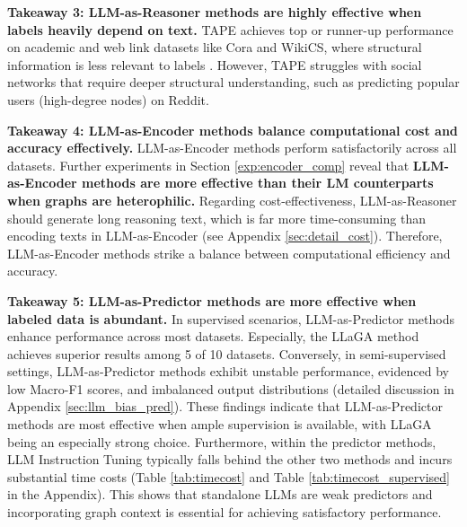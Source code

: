 
\textbf{Takeaway 3: LLM-as-Reasoner methods are highly effective when labels heavily depend on text.} TAPE achieves top or runner-up performance on academic and web link datasets like Cora and WikiCS, where structural information is less relevant to labels \cite{zhang2021graphless}. However, TAPE struggles with social networks that require deeper structural understanding, such as predicting popular users (high-degree nodes) on Reddit. 


\textbf{Takeaway 4: LLM-as-Encoder methods balance computational cost and accuracy effectively.} LLM-as-Encoder methods perform satisfactorily across all datasets. Further experiments in Section \ref{exp:encoder_comp} reveal that \textbf{LLM-as-Encoder methods are more effective than their LM counterparts when graphs are heterophilic.} Regarding cost-effectiveness, LLM-as-Reasoner should generate long reasoning text, which is far more time-consuming than encoding texts in LLM-as-Encoder (see Appendix \ref{sec:detail_cost}). Therefore, LLM-as-Encoder methods strike a balance between computational efficiency and accuracy.


\textbf{Takeaway 5: LLM-as-Predictor methods are more effective when labeled data is abundant.} In supervised scenarios, LLM-as-Predictor methods enhance performance across most datasets. Especially, the LLaGA method achieves superior results among 5 of 10 datasets. Conversely, in semi-supervised settings, LLM-as-Predictor methods exhibit unstable performance, evidenced by low Macro-F1 scores, and imbalanced output distributions (detailed discussion in Appendix \ref{sec:llm_bias_pred}). These findings indicate that LLM-as-Predictor methods are most effective when ample supervision is available, with LLaGA being an especially strong choice. Furthermore, within the predictor methods, LLM Instruction Tuning typically falls behind the other two methods and incurs substantial time costs (Table \ref{tab:timecost} and Table \ref{tab:timecost_supervised} in the Appendix). This shows that standalone LLMs are weak predictors and incorporating graph context is essential for achieving satisfactory performance.



